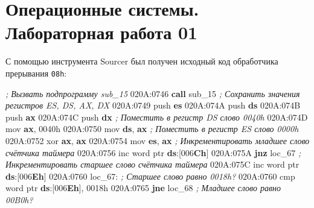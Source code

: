 \documentclass[
]{article}
\author{}
\date{}
\newenvironment{Shaded}{}{}
\newcommand{\BaseNTok}[1]{\textcolor[rgb]{0.25,0.63,0.44}{#1}}
\newcommand{\BuiltInTok}[1]{\textcolor[rgb]{0.00,0.50,0.00}{#1}}
\newcommand{\CommentTok}[1]{\textcolor[rgb]{0.38,0.63,0.69}{\textit{#1}}}
\newcommand{\ControlFlowTok}[1]{\textcolor[rgb]{0.00,0.44,0.13}{\textbf{#1}}}
\newcommand{\DataTypeTok}[1]{\textcolor[rgb]{0.56,0.13,0.00}{#1}}
\newcommand{\DecValTok}[1]{\textcolor[rgb]{0.25,0.63,0.44}{#1}}
\newcommand{\ErrorTok}[1]{\textcolor[rgb]{1.00,0.00,0.00}{\textbf{#1}}}
\newcommand{\KeywordTok}[1]{\textcolor[rgb]{0.00,0.44,0.13}{\textbf{#1}}}
\newcommand{\NormalTok}[1]{#1}
\newcommand{\OperatorTok}[1]{\textcolor[rgb]{0.40,0.40,0.40}{#1}}
\begin{document}
\hypertarget{ux43eux43fux435ux440ux430ux446ux438ux43eux43dux43dux44bux435-ux441ux438ux441ux442ux435ux43cux44b.-ux43bux430ux431ux43eux440ux430ux442ux43eux440ux43dux430ux44f-ux440ux430ux431ux43eux442ux430-01}{%
\section{Операционные системы. Лабораторная работа
01}\label{ux43eux43fux435ux440ux430ux446ux438ux43eux43dux43dux44bux435-ux441ux438ux441ux442ux435ux43cux44b.-ux43bux430ux431ux43eux440ux430ux442ux43eux440ux43dux430ux44f-ux440ux430ux431ux43eux442ux430-01}}

С помощью инструмента Sourcer был получен исходный код обработчика
прерывания \texttt{08h}:

\begin{Shaded}
\begin{Highlighting}[]
\CommentTok{; Вызвать подпрограмму sub\_15}
\NormalTok{020A:0746 }\ControlFlowTok{call}\NormalTok{ sub\_15}
\CommentTok{; Сохранить значения регистров ES, DS, AX, DX}
\NormalTok{020A:0749 }\BuiltInTok{push} \KeywordTok{es}
\NormalTok{020A:074A }\BuiltInTok{push} \KeywordTok{ds}
\NormalTok{020A:074B }\BuiltInTok{push} \KeywordTok{ax}
\NormalTok{020A:074C }\BuiltInTok{push} \KeywordTok{dx}
\CommentTok{; Поместить в регистр DS слово 0040h}
\NormalTok{020A:074D }\BuiltInTok{mov} \KeywordTok{ax}\OperatorTok{,} \BaseNTok{0040h}
\NormalTok{020A:0750 }\BuiltInTok{mov} \KeywordTok{ds}\OperatorTok{,} \KeywordTok{ax}
\CommentTok{; Поместить в регистр ES слово 0000h}
\NormalTok{020A:0752 }\BuiltInTok{xor} \KeywordTok{ax}\OperatorTok{,} \KeywordTok{ax}
\NormalTok{020A:0754 }\BuiltInTok{mov} \KeywordTok{es}\OperatorTok{,} \KeywordTok{ax}
\CommentTok{; Инкрементировать младшее слово счётчика таймера}
\NormalTok{020A:0756 }\BuiltInTok{inc} \DataTypeTok{word} \DataTypeTok{ptr} \KeywordTok{ds}\OperatorTok{:[}\DecValTok{006}\ErrorTok{Ch}\OperatorTok{]}
\NormalTok{020A:075A }\ControlFlowTok{jnz}\NormalTok{ loc\_67}
\CommentTok{; Инкрементировать старшее слово счётчика таймера }
\NormalTok{020A:075C }\BuiltInTok{inc} \DataTypeTok{word} \DataTypeTok{ptr} \KeywordTok{ds}\OperatorTok{:[}\DecValTok{006}\ErrorTok{Eh}\OperatorTok{]}
\NormalTok{020A:0760 loc\_67}\OperatorTok{:}
\CommentTok{; Старшее слово равно 0018h?}
\NormalTok{020A:0760 }\BuiltInTok{cmp} \DataTypeTok{word} \DataTypeTok{ptr} \KeywordTok{ds}\OperatorTok{:[}\DecValTok{006}\ErrorTok{Eh}\OperatorTok{],} \BaseNTok{0018h}
\NormalTok{020A:0765 }\ControlFlowTok{jne}\NormalTok{ loc\_68}
\CommentTok{; Младшее слово равно 00B0h?}

\end{Highlighting}
\end{Shaded}
\end{document}
